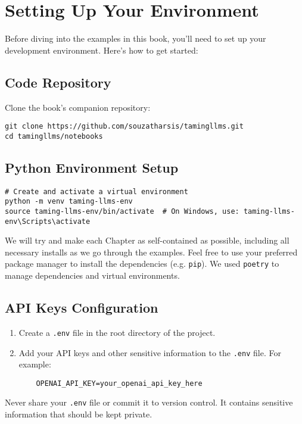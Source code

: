 \section{Setting Up Your Environment}

Before diving into the examples in this book, you'll need to set up your development environment. Here's how to get started:

\subsection{Code Repository}
Clone the book's companion repository:
\begin{verbatim}
git clone https://github.com/souzatharsis/tamingllms.git
cd tamingllms/notebooks
\end{verbatim}

\subsection{Python Environment Setup}
\begin{verbatim}
# Create and activate a virtual environment
python -m venv taming-llms-env
source taming-llms-env/bin/activate  # On Windows, use: taming-llms-env\Scripts\activate
\end{verbatim}

We will try and make each Chapter as self-contained as possible, including all necessary installs as we go through the examples.
Feel free to use your preferred package manager to install the dependencies (e.g. \texttt{pip}). We used \texttt{poetry} to manage dependencies and virtual environments.

\subsection{API Keys Configuration}
\begin{enumerate}
    \item Create a \texttt{.env} file in the root directory of the project.
    \item Add your API keys and other sensitive information to the \texttt{.env} file. For example:

    \begin{verbatim}
    OPENAI_API_KEY=your_openai_api_key_here
    \end{verbatim}
\end{enumerate}

\begin{note}
Never share your \texttt{.env} file or commit it to version control. It contains sensitive information that should be kept private.
\end{note}

